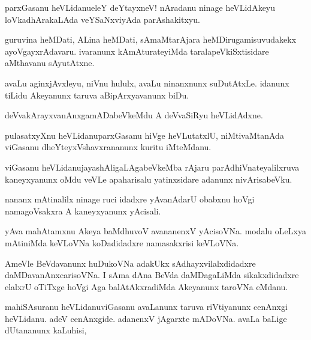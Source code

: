 \begin{mng}
parxGasanu heVLidanu\mdash eleY deYtayxneV! nAradanu ninage heVLidAkeyu loVkadhArakaLAda veYSaNxviyAda parAshakitxyu.
\end{mng}

\begin{mng}
guruvina heMDati, ALina heMDati, sAmaMtarAjara heMDirugamisuvudakekx ayoVgayxrAdavaru. ivaranunx kAmAturateyiMda taralapeVkiSxtisidare aMthavanu sAyutAtxne.
\end{mng}

\begin{mng}
avaLu aginxjAvxleyu, niVnu hululx, avaLu ninanxnunx suDutAtxLe. idanunx tiLidu Akeyanunx taruva aBipArxyavanunx biDu.
\end{mng}

\begin{mng}
deVvakArayxvanAnxgamADabeVkeMdu A deVvaSiRyu heVLidAdxne.
\end{mng}

\begin{mng}
pulasatxyXnu heVLidanu\mdash parxGasanu hiVge heVLutatxlU, niMtivaMtanAda viGasanu dheYteyxVshavxrananunx kuritu iMteMdanu.
\end{mng}

\begin{mng}
viGasanu heVLidanu\mdash jayashAligaLAgabeVkeMba rAjaru parAdhiVnateyalilxruva kaneyxyanunx oMdu veVLe apaharisalu yatinxsidare adanunx nivArisabeVku.
\end{mng}

\begin{mng}
nananx mAtinalilx ninage ruci idadxre yAvanAdarU obabxnu hoVgi namagoVsakxra A kaneyxyanunx yAcisali.
\end{mng}

\begin{mng}
yAva mahAtamxnu Akeya baMdhuvoV avananenxV yAcisoVNa. modalu oLeLxya mAtiniMda keVLoVNa koDadidadxre namasakxrisi keVLoVNa.
\end{mng}

\begin{mng}
AmeVle BeVdavanunx huDukoVNa adakUkx sAdhayxvilalxdidadxre daMDavanAnxcarisoVNa. I sAma dAna BeVda daMDagaLiMda sikakxdidadxre elalxrU oTiTxge hoVgi Aga balAtAkxradiMda Akeyanunx taroVNa eMdanu.
\end{mng}

\begin{mng}
mahiSAsuranu heVLidanu\mdash viGasanu avaLanunx taruva riVtiyanunx cenAnxgi heVLidanu. adeV cenAnxgide. adanenxV jAgarxte mADoVNa. avaLa baLige dUtananunx kaLuhisi,
\end{mng}

